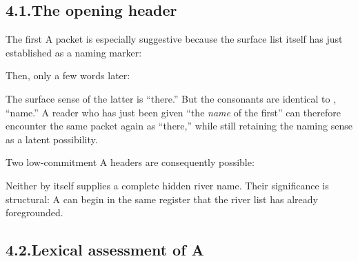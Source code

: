 \subsection*{4.1.\quad The opening header}

The first A packet is especially suggestive because the surface list itself has just established  as a naming marker:


Then, only a few words later:


The surface sense of the latter  is ``there.''  But the consonants are identical to , ``name.''  A reader who has just been given ``the \emph{name} of the first'' can therefore encounter the same packet again as ``there,'' while still retaining the naming sense as a latent possibility.

Two low-commitment A headers are consequently possible:


Neither by itself supplies a complete hidden river name.  Their significance is structural: A can begin in the same  register that the river list has already foregrounded.

\subsection*{4.2.\quad Lexical assessment of A}

